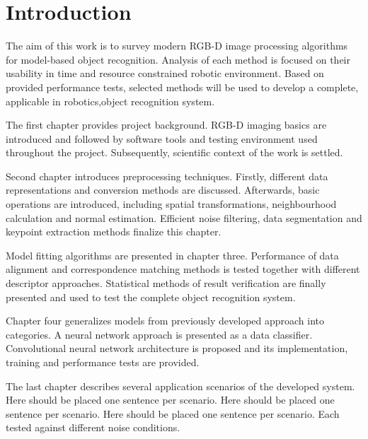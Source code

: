 \chapter*{Introduction}
\label{cha:introduction}



The aim of this work is to survey modern RGB-D image processing algorithms for model-based object recognition. Analysis of each method is focused on their usability in time and resource constrained robotic environment. Based on provided performance tests, selected methods will be used to develop a complete, applicable in robotics,object recognition system.

The first chapter provides project background. RGB-D imaging basics are introduced and followed by software tools and testing environment used throughout the project. Subsequently, scientific context of the work is settled.

Second chapter introduces preprocessing techniques. Firstly, different data representations and conversion methods are discussed. Afterwards, basic operations are introduced, including spatial transformations, neighbourhood calculation and normal estimation. Efficient noise filtering, data segmentation and keypoint extraction methods finalize this chapter.

Model fitting algorithms are presented in chapter three. Performance of data alignment and correspondence matching methods is tested together with different descriptor approaches. Statistical methods of result verification are finally presented and used to test the complete object recognition system.

Chapter four generalizes models from previously developed approach into categories. A neural network approach is presented as a data classifier. Convolutional neural network architecture is proposed and its implementation, training and performance tests are provided.

The last chapter describes several application scenarios of the developed system. Here should be placed one sentence per scenario. Here should be placed one sentence per scenario. Here should be placed one sentence per scenario. Each tested against different noise conditions.


